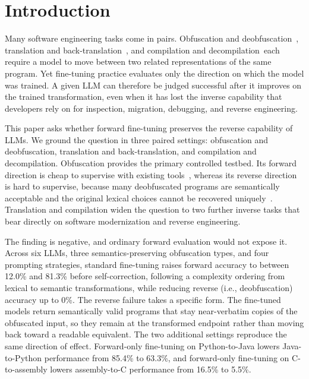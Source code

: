 
\section{Introduction}
\label{sec:introduction}

Many software engineering tasks come in pairs. Obfuscation and
deobfuscation~\cite{yadegari2015generic}, translation and
back-translation~\cite{lachaux2021unsupervised,pan2024lost}, and compilation and
decompilation~\cite{tan2024llm4decompile}each require a model to move between two related representations of the same program. Yet fine-tuning practice evaluates only the direction on which the model was trained. A given LLM can therefore be judged
successful after it improves on the trained transformation, even when it has lost
the inverse capability that developers rely on for inspection, migration,
debugging, and reverse engineering.

This paper asks whether forward fine-tuning preserves the reverse capability of LLMs. We ground the question in three paired settings:  obfuscation and
deobfuscation,  translation and back-translation, and  compilation and
decompilation. Obfuscation provides the primary controlled testbed. Its forward
direction is cheap to supervise with existing
tools~\cite{superblaubeere27obfuscator}, whereas its reverse direction is hard to
supervise, because many deobfuscated programs are semantically acceptable and the
original lexical choices cannot be recovered
uniquely~\cite{raychev2015jsnice, bichsel2016deguard}. Translation
and compilation widen the question to two further inverse tasks that bear
directly on software modernization and reverse engineering.

The finding is negative, and ordinary forward evaluation would not expose it.
Across six LLMs, three semantics-preserving obfuscation types, and four prompting
strategies, 
standard fine-tuning raises forward accuracy to between 12.0\% and
81.3\% before self-correction, following a complexity ordering from lexical to semantic transformations, while reducing reverse (i.e., deobfuscation) accuracy up to 0\%. 
The reverse failure takes a
specific form. The fine-tuned models return semantically valid programs that stay
near-verbatim copies of the obfuscated input, so they remain at the transformed
endpoint rather than moving back toward a readable equivalent. The two additional
settings reproduce the same direction of effect. Forward-only fine-tuning on
Python-to-Java lowers Java-to-Python performance from 85.4\% to 63.3\%, and
forward-only fine-tuning on C-to-assembly lowers assembly-to-C performance from
16.5\% to 5.5\%.

